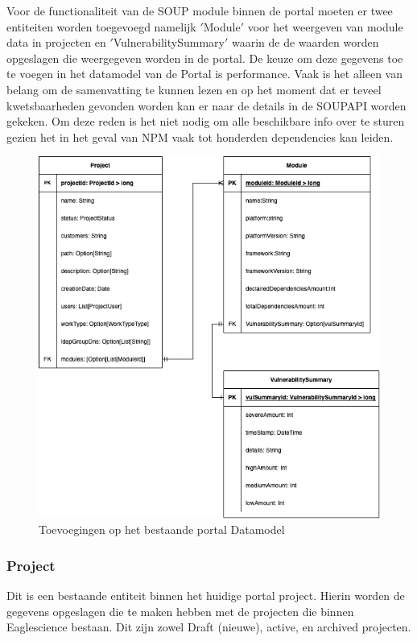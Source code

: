 Voor de functionaliteit van de SOUP module binnen de portal moeten er twee entiteiten worden toegevoegd namelijk $'$Module$'$ voor het weergeven van module data in projecten en $'$VulnerabilitySummary$'$ waarin de de waarden worden opgeslagen die weergegeven worden in de portal. De keuze om deze gegevens toe te voegen in het datamodel van de Portal is performance. Vaak is het alleen van belang om de samenvatting te kunnen lezen en op het moment dat er teveel kwetsbaarheden gevonden worden kan er naar de details in de SOUPAPI worden gekeken. Om deze reden is het niet nodig om alle beschikbare info over te sturen gezien het in het geval van NPM vaak tot honderden dependencies kan leiden.


\begin{figure}[bth]
    \myfloatalign
    \includegraphics[width=15cm]{gfx/SOUPAPI-PortalDM}
    \caption{Toevoegingen op het bestaande portal Datamodel}
    \label{fig:SOUP-portalDm}
\end{figure}
\clearpage
\subsubsection{Project}\label{subsubsec:portalProject}
Dit is een bestaande entiteit binnen het huidige portal project. Hierin worden de gegevens opgeslagen die te maken hebben met de projecten die binnen Eaglescience bestaan. Dit zijn zowel Draft (nieuwe), active, en archived projecten.

